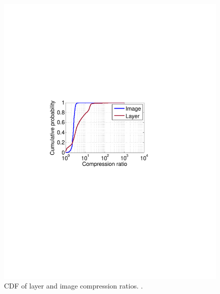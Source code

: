 \begin{figure}[t]
\begin{minipage}{0.22\textwidth}
		\includegraphics[width=1\textwidth]{graphs/compress-ratio-cdf.pdf}
		\caption{CDF of layer and image compression ratios.
		.
		}
		\label{fig:compress-ratio}
	\end{minipage}
\end{figure}
